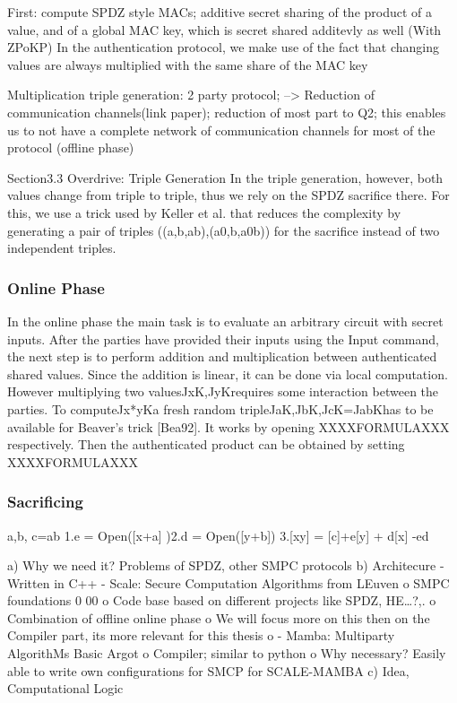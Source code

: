 \documentclass[english,runningheads,a4paper]{llncs}[2018/03/10]
\begin{document}
First: compute SPDZ style MACs; additive secret sharing of the product of a value, and of a global MAC key, which is secret shared additevly as well (With ZPoKP)
In the authentication protocol, we make use of the fact that changing values are always multiplied with the same share of the MAC key

Multiplication triple generation: 2 party protocol; --> Reduction of communication channels(link paper); reduction of most part to Q2; this enables us to not have a complete network of communication channels for most of the protocol (offline phase)

Section3.3 Overdrive: Triple Generation
 In the triple generation, however, both values change from triple to triple, thus we rely on the SPDZ sacrifice there. For this, we use a trick used by Keller et al. that reduces the complexity by generating a pair of triples ((a,b,ab),(a0,b,a0b)) for the sacrifice instead of two independent triples. 



\subsubsection{Online Phase}
In the online phase the main task is to evaluate an arbitrary circuit with secret inputs. After the parties have provided their inputs using the Input command, the next step is to perform addition and multiplication between authenticated shared values. Since the addition is linear, it can be done via local computation. However multiplying two valuesJxK,JyKrequires some interaction between the parties. To computeJx*yKa fresh random tripleJaK,JbK,JcK=JabKhas to be available for Beaver’s trick [Bea92]. It works by opening XXXXFORMULAXXX  respectively. Then the authenticated product can be obtained by setting XXXXFORMULAXXX




\subsubsection{Sacrificing}
a,b, c=ab
1.e = Open([x+a]
)2.d = Open([y+b])
3.[xy] = [c]+e[y] + d[x] -ed




a)	Why we need it? Problems of SPDZ, other SMPC protocols
b)	Architecure
-	Written in C++
-	Scale: Secure Computation Algorithms from LEuven
o	SMPC foundations
0 00 o	Code base based on different projects like SPDZ, HE…?,.
o	Combination of offline  online phase
o	We will focus more on this then on the Compiler part, its more relevant for this thesis
o	
-	Mamba: Multiparty AlgorithMs Basic Argot
o	Compiler; similar to python
o	Why necessary? Easily able to write own configurations for SMCP for SCALE-MAMBA
c)	Idea, Computational Logic
\end{document}

